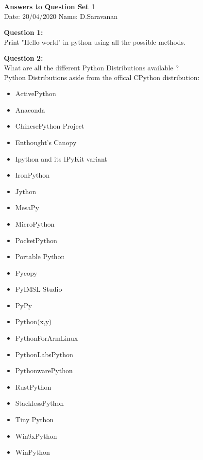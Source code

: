 \documentclass[a4paper,11pt,openright]{report}
\begin{document}
\singlespacing
\pagestyle{plain}

\begin{center}
\textbf{Answers to Question Set 1} \\
Date: 20/04/2020 \hspace{2mm} Name: D.Saravanan
\end{center}

\vspace{20px}

\textbf{Question 1:} \\
Print "Hello world" in python using all the possible methods. \\



\vspace{30px}

\textbf{Question 2:} \\
What are all the different Python Distributions available ? \\
Python Distributions aside from the offical CPython distribution:
\begin{itemize}
\item ActivePython
\item Anaconda
\item ChinesePython Project
\item Enthought's Canopy
\item Ipython and its IPyKit variant
\item IronPython
\item Jython
\item MesaPy
\item MicroPython
\item PocketPython
\item Portable Python
\item Pycopy
\item PyIMSL Studio
\item PyPy
\item Python(x,y)
\item PythonForArmLinux
\item PythonLabsPython
\item PythonwarePython
\item RustPython
\item StacklessPython
\item Tiny Python
\item Win9xPython
\item WinPython
\end{itemize}
\end{document}
